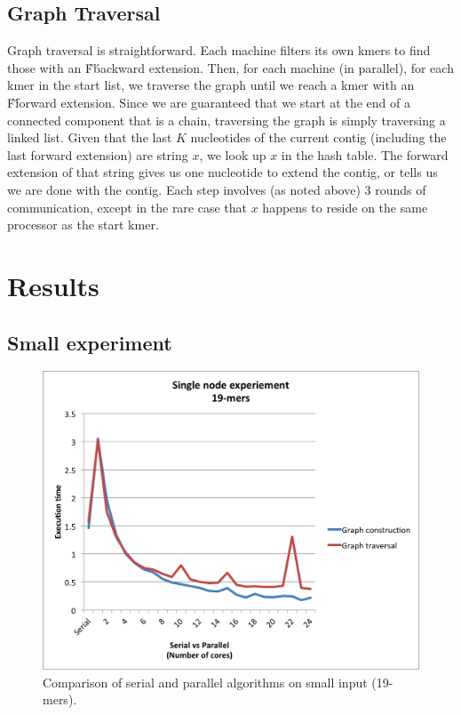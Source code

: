 \documentclass{article}
\begin{document}
\subsection{Graph Traversal}
Graph traversal is straightforward.  Each machine filters its own kmers to find those with an \'F\' backward extension.  Then, for each machine (in parallel), for each kmer in the start list, we traverse the graph until we reach a kmer with an \'F\' forward extension.  Since we are guaranteed that we start at the end of a connected component that is a chain, traversing the graph is simply traversing a linked list.  Given that the last $K$ nucleotides of the current contig (including the last forward extension) are string $x$, we look up $x$ in the hash table.  The forward extension of that string gives us one nucleotide to extend the contig, or tells us we are done with the contig.  Each step involves (as noted above) 3 rounds of communication, except in the rare case that $x$ happens to reside on the same processor as the start kmer.

\section{Results}
\subsection{Small experiment}

\begin{figure}
  \includegraphics[width=\textwidth]{plots/Result_single_small.png}
  \caption{Comparison of serial and parallel algorithms on small input (19-mers).}
  \label{fig:all}
\end{figure}
\end{document}
